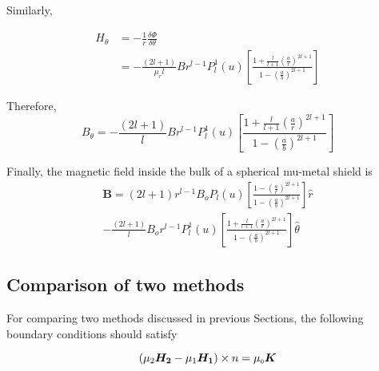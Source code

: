 Similarly,

\begin{equation}\label{Ht}
\begin{split}
 H_\theta &=-\frac{1}{r}\frac{\delta \Phi}{\delta \theta}\\
         & =-\frac{(2l+1)}{\mu_rl}Br^{l-1}P_l^1(u)\left[
         \frac{1+\frac{l}{l+1}\left(\frac{a}{r}\right)^{2l+1}}
         {1-\left(\frac{a}{b}\right)^{2l+1}}
         \right]
\end{split}
\end{equation}

Therefore,
\begin{equation}\label{Bt}
B_\theta=-\frac{(2l+1)}{l}Br^{l-1}P_l^1(u)\left[\frac{1+\frac{l}{l+1}\left(\frac{a}{r}\right)^{2l+1}}{1-\left(\frac{a}{b}\right)^{2l+1}}\right]
\end{equation}

Finally, the magnetic field inside the bulk of a spherical mu-metal shield is
\begin{multline}\label{B}
\bm{B}=(2l+1)r^{l-1}B_o P_l(u)\left[\frac{1-\left(\frac{a}{r}\right)^{2l+1}}{1-\left(\frac{a}{b}\right)^{2l+1}}\right] \hat{r} \\ -\frac{(2l+1)}{l}B_o r^{l-1}P_l^1(u)\left[\frac{1+\frac{l}{l+1}\left(\frac{a}{r}\right)^{2l+1}}{1-\left(\frac{a}{b}\right)^{2l+1}}\right] \hat{\theta}
\end{multline}


\subsection{Comparison of two methods}
For comparing two methods discussed in previous Sections, the following boundary conditions should satisfy

\begin{equation}\label{b3}   
(\mu_2\bm{H_2} - \mu_1\bm{H_1})\times n = \mu_{\scriptscriptstyle 0} \bm{K}  
\end{equation}

